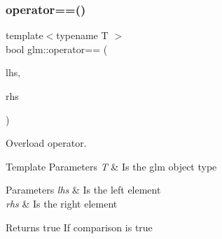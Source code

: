 \subsubsection{\texorpdfstring{operator==()}{operator==()}\hspace{0.1cm}{\footnotesize\ttfamily [2/2]}}
{\footnotesize\ttfamily template$<$typename T $>$ \\
bool glm\+::operator== (\begin{DoxyParamCaption}\item[{tvec2$<$ T $>$ const \&}]{lhs,  }\item[{tvec2$<$ T $>$ const \&}]{rhs }\end{DoxyParamCaption})}



Overload operator. 


\begin{DoxyTemplParams}{Template Parameters}
{\em T} & Is the glm object type \\
\hline
\end{DoxyTemplParams}

\begin{DoxyParams}{Parameters}
{\em lhs} & Is the left element \\
\hline
{\em rhs} & Is the right element \\
\hline
\end{DoxyParams}
\begin{DoxyReturn}{Returns}
true If comparison is true 
\end{DoxyReturn}
